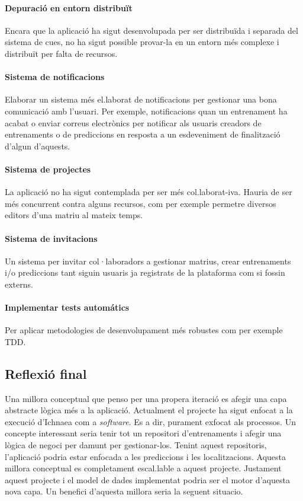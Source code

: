 \paragraph{Depuraci\'{o} en entorn distribuït} Encara que la aplicaci\'{o} ha sigut desenvolupada per ser distribuïda i separada del sistema de cues, no ha sigut possible provar-la en un entorn m\'{e}s complexe i distribuït per falta de recursos.

\paragraph{Sistema de notificacions} Elaborar un sistema m\'{e}s el.laborat de notificacions per gestionar una bona comunicació amb l'usuari. Per exemple, notificacions quan un entrenament ha acabat o enviar correus electrònics per notificar als usuaris creadors de entrenaments o de prediccions en resposta a un esdeveniment de finalitzaci\'{o} d'algun d'aquests. 

\paragraph{Sistema de projectes} La aplicaci\'{o} no ha sigut contemplada per ser m\'{e}s col.laborat-iva. Hauria de ser m\'{e}s concurrent contra alguns recursos, com per exemple permetre diversos editors d'una matriu al mateix temps.

\paragraph{Sistema de invitacions} Un sistema per invitar col·laboradors a gestionar matrius, crear entrenaments i/o prediccions tant siguin usuaris ja registrats de la plataforma com si fossin externs.

\paragraph{Implementar tests autom\'{a}tics} Per aplicar metodologies de desenvolupament m\'{e}s robustes com per exemple TDD.\cite{tdd}

\subsection{Reflexió final}
Una millora conceptual que penso per una propera iteració es afegir una capa abstracte lògica m\'{e}s a la aplicació. Actualment el projecte ha sigut enfocat a la execució d'Ichnaea com a \textit{software}. Es a dir, purament exfocat als processos. Un concepte interessant seria tenir tot un repositori d'entrenaments i afegir una lògica de negoci per damunt per gestionar-los. Tenint aquest repositoris, l'aplicació podria estar enfocada a les prediccions i les localitzacions. Aquesta millora conceptual es completament escal.lable a aquest projecte. Justament aquest projecte i el model de dades implementat podria ser el motor d'aquesta nova capa. Un benefici d'aquesta millora seria la seguent situacio.

